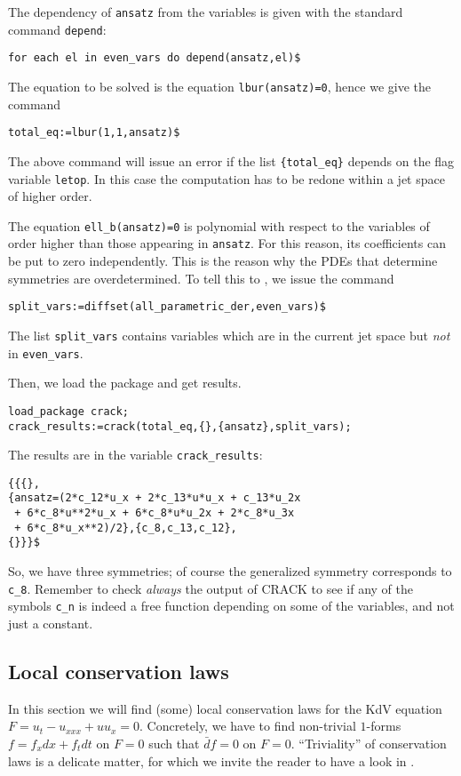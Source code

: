 The dependency of \texttt{ansatz} from the variables is given with the standard
\REDUCE command \texttt{depend}:
\begin{verbatim}
for each el in even_vars do depend(ansatz,el)$
\end{verbatim}
The equation to be solved is the equation \texttt{lbur(ansatz)=0}, hence we
give the command
\begin{verbatim}
total_eq:=lbur(1,1,ansatz)$
\end{verbatim}
The above command will issue an error if the list \texttt{\{total\_eq\}}
depends on the flag variable \texttt{letop}. In this case the computation has
to be redone within a jet space of higher order.

The equation \texttt{ell\_b(ansatz)=0} is polynomial with respect to the
variables of order higher than those appearing in \texttt{ansatz}. For this
reason, its coefficients can be put to zero independently. This is the reason
why the PDEs that determine symmetries are overdetermined. To tell this to
\crack, we issue the command
\begin{verbatim}
split_vars:=diffset(all_parametric_der,even_vars)$
\end{verbatim}
The list \texttt{split\_vars} contains variables which are in the current
\cde jet space but \emph{not} in \texttt{even\_vars}.

Then, we load the package \crack and get results.
\begin{verbatim}
load_package crack;
crack_results:=crack(total_eq,{},{ansatz},split_vars);
\end{verbatim}
The results are in the variable \texttt{crack\_results}:
\begin{verbatim}
{{{},
{ansatz=(2*c_12*u_x + 2*c_13*u*u_x + c_13*u_2x
 + 6*c_8*u**2*u_x + 6*c_8*u*u_2x + 2*c_8*u_3x
 + 6*c_8*u_x**2)/2},{c_8,c_13,c_12},
{}}}$
\end{verbatim}
So, we have three symmetries; of course the generalized symmetry corresponds to
\texttt{c\_8}. Remember to check \emph{always} the output of CRACK to see if
any of the symbols \texttt{c\_n} is indeed a free function depending on some of
the variables, and not just a constant.


\subsection{Local conservation laws}
\label{cdesec:local-cons-laws}

In this section we will find (some) local conservation laws for the KdV
equation $F=u_t-u_{xxx}+uu_x=0$. Concretely, we have to find non-trivial
$1$-forms $f=f_xdx+f_tdt$ on $F=0$ such that $\bar d f=0$ on
$F=0$. ``Triviality'' of conservation laws is a delicate matter, for which we
invite the reader to have a look in \cite{Krasilshchik:99}.

